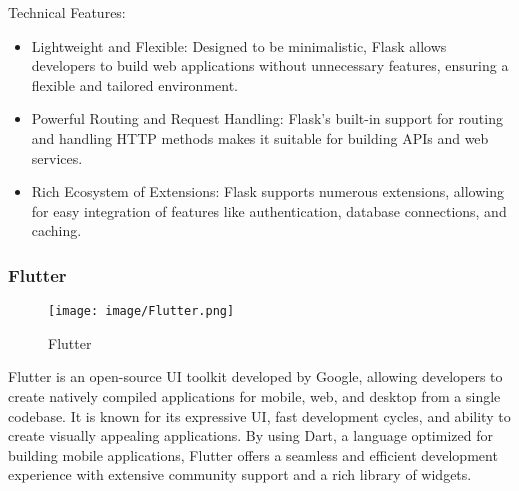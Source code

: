 \documentclass[conference]{IEEEtran}
\begin{document}
Technical Features:
\begin{itemize}
    \item Lightweight and Flexible: Designed to be minimalistic, Flask allows developers to build web applications without unnecessary features, ensuring a flexible and tailored environment.\\
    \item Powerful Routing and Request Handling: Flask’s built-in support for routing and handling HTTP methods makes it suitable for building APIs and web services.\\
    \item Rich Ecosystem of Extensions: Flask supports numerous extensions, allowing for easy integration of features like authentication, database connections, and caching.\\
\end{itemize}


\subsubsection{Flutter}

\begin{figure}[h!]
    \centering
    \texttt{[image: image/Flutter.png]}
    \caption{Flutter}
    \label{fig:enter-label}
\end{figure}

\noindent Flutter is an open-source UI toolkit developed by Google, allowing developers to create natively compiled applications for mobile, web, and desktop from a single codebase. It is known for its expressive UI, fast development cycles, and ability to create visually appealing applications. By using Dart, a language optimized for building mobile applications, Flutter offers a seamless and efficient development experience with extensive community support and a rich library of widgets.\\
\end{document}
